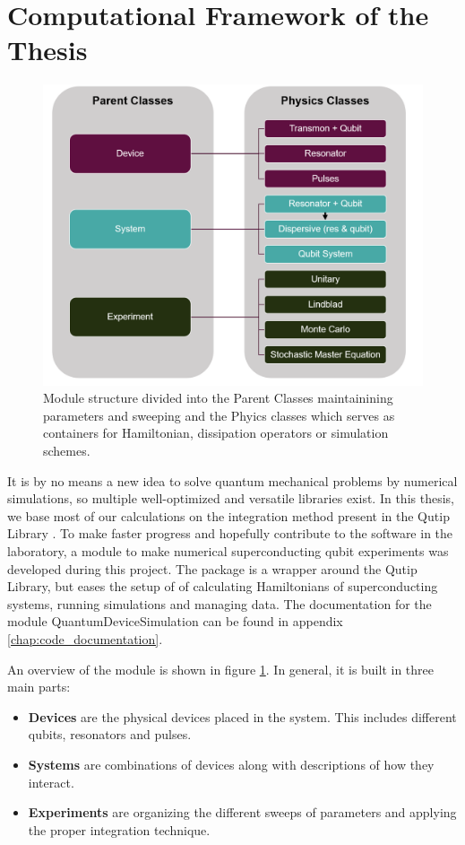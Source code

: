 \section{Computational Framework of the Thesis}
\begin{figure}[b]
    \centering
    \includegraphics[width = 0.9 \textwidth]{Figs/Sections/Introduction/module_v2.png}
    \caption{Module structure divided into the Parent Classes maintainining parameters and sweeping and the Phyics classes which serves as containers for Hamiltonian, dissipation operators or simulation schemes.}
    \label{fig:module_overview}
\end{figure}
It is by no means a new idea to solve quantum mechanical problems by numerical simulations, so multiple well-optimized and versatile libraries exist. In this thesis, we base most of our calculations on the integration method present in the Qutip Library \cite{johansson_qutip_2012}. To make faster progress and hopefully contribute to the software in the laboratory, a module to make numerical superconducting qubit experiments was developed during this project. The package is a wrapper around the Qutip Library, but eases the setup of of calculating Hamiltonians of superconducting systems, running simulations and managing data. The documentation for the module QuantumDeviceSimulation can be found in appendix \ref{chap:code_documentation}.

An overview of the module is shown in figure \ref{fig:module_overview}. In general, it is built in three main parts:
\begin{itemize}
    \item \textbf{Devices} are the physical devices placed in the system. This includes different qubits, resonators and pulses.
    \item \textbf{Systems} are combinations of devices along with descriptions of how they interact.
    \item \textbf{Experiments} are organizing the different sweeps of parameters and applying the proper integration technique. 
\end{itemize}